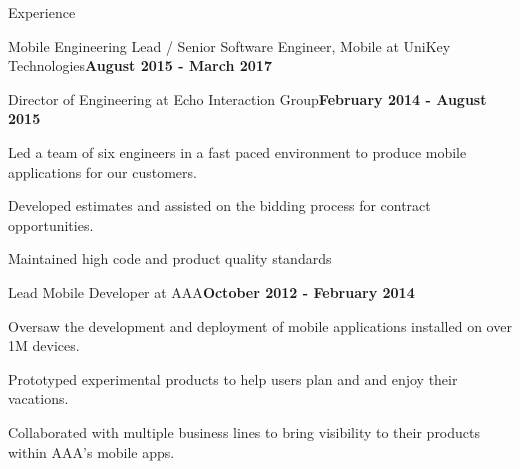 \documentclass{resume} %
\begin{document}
\begin{rSection}{Experience}
\begin{rSubsection}{Mobile Engineering Lead / Senior Software Engineer, Mobile at UniKey Technologies}{\bf August 2015 - March 2017}{}{}
\end{rSubsection}


\begin{rSubsection}{Director of Engineering at Echo Interaction Group}{\bf February 2014 - August 2015}{}{}

\item Led a team of six engineers in a fast paced environment to produce mobile applications for our customers.
\item Developed estimates and assisted on the bidding process for contract opportunities.
\item Maintained high code and product quality standards 


\end{rSubsection}


\begin{rSubsection}{Lead Mobile Developer at AAA}{\bf October 2012 - February 2014}{}{}

\item Oversaw the development and deployment of mobile applications installed on over 1M devices.
\item Prototyped experimental products to help users plan and and enjoy their vacations.
\item Collaborated with multiple business lines to bring visibility to their products within AAA's mobile apps.

\end{rSubsection}


\end{rSection}

\end{document}
